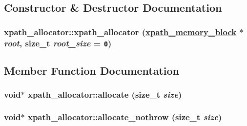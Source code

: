 \subsection{Constructor \& Destructor Documentation}
\hypertarget{classxpath__allocator_3b8ba1722fba115d05949d8f592080e8}{
\subsubsection[xpath\_\-allocator]{\setlength{\rightskip}{0pt plus 5cm}xpath\_\-allocator::xpath\_\-allocator (\hyperlink{structxpath__memory__block}{xpath\_\-memory\_\-block} $\ast$ {\em root}, size\_\-t {\em root\_\-size} = {\tt 0})}}
\label{classxpath__allocator_3b8ba1722fba115d05949d8f592080e8}




\subsection{Member Function Documentation}
\hypertarget{classxpath__allocator_ad95aa445f2fdc7c3d1c19b1f3d67cb1}{
\subsubsection[allocate]{\setlength{\rightskip}{0pt plus 5cm}void$\ast$ xpath\_\-allocator::allocate (size\_\-t {\em size})}}
\label{classxpath__allocator_ad95aa445f2fdc7c3d1c19b1f3d67cb1}


\hypertarget{classxpath__allocator_a66f3703548657eca5316392a2d79d00}{
\subsubsection[allocate\_\-nothrow]{\setlength{\rightskip}{0pt plus 5cm}void$\ast$ xpath\_\-allocator::allocate\_\-nothrow (size\_\-t {\em size})}}
\label{classxpath__allocator_a66f3703548657eca5316392a2d79d00}


